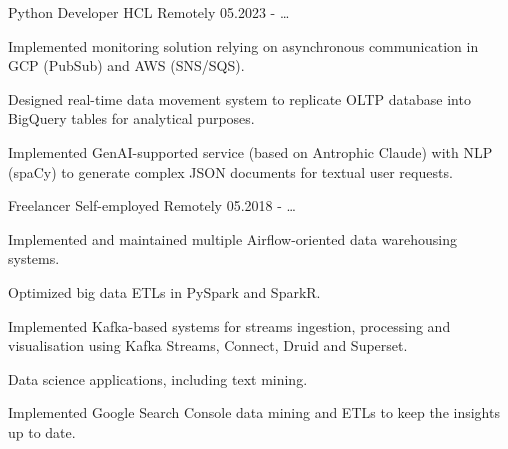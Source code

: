 

\begin{cventries}

  \cventry
    {Python Developer} %
    {HCL} %
    {Remotely} %
    {05.2023 - \ldots} %
    {
      \begin{cvitems} %
        \item {Implemented monitoring solution relying on asynchronous communication in GCP (PubSub) and AWS (SNS/SQS).}
        \item {Designed real-time data movement system to replicate OLTP database into BigQuery tables for analytical purposes.}
        \item {Implemented GenAI-supported service (based on Antrophic Claude) with NLP (spaCy) to generate complex JSON documents for textual user requests.}
      \end{cvitems}
    }

  \cventry
    {Freelancer} %
    {Self-employed} %
    {Remotely} %
    {05.2018 - \ldots} %
    {
      \begin{cvitems} %
        \item {Implemented and maintained multiple Airflow-oriented data warehousing systems.}
        \item {Optimized big data ETLs in PySpark and SparkR.}
        \item {Implemented Kafka-based systems for streams ingestion, processing and visualisation using Kafka Streams, Connect, Druid and Superset.}
        \item {Data science applications, including text mining.}
        \item {Implemented Google Search Console data mining and ETLs to keep the insights up to date.}
      \end{cvitems}
    }


\end{cventries}
